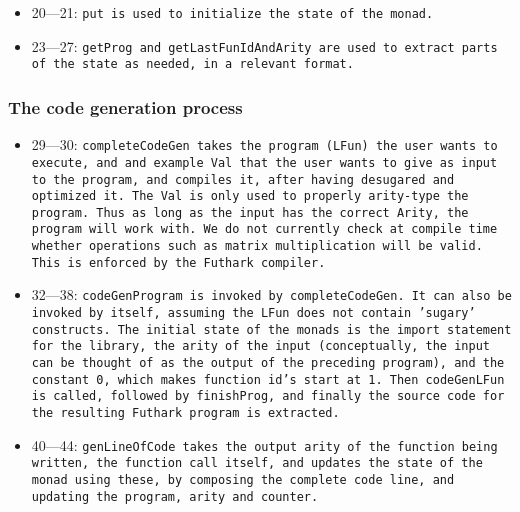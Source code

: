 
\begin{itemize}
	\item 20---21: \tt{put} is used to initialize the state of the monad.
	\item 23---27: \tt{getProg} and \tt{getLastFunIdAndArity} are used to
	extract parts of the state as needed, in a relevant format.
\end{itemize}

\subsubsection{The code generation process}


\begin{itemize}
	\item 29---30: \tt{completeCodeGen} takes the program (\tt{LFun}) the
	user wants to execute, and and example \tt{Val} that the user wants to
	give as input to the program, and compiles it, after having desugared
	and optimized it.  The \tt{Val} is only used to properly arity-type the
	program.  Thus as long as the input has the correct Arity, the program
	will work with.  We do not currently check at compile time whether
	operations such as matrix multiplication will be valid.  This is enforced
	by the Futhark compiler.
\end{itemize}


\begin{itemize}
	\item 32---38: \tt{codeGenProgram} is invoked by \tt{completeCodeGen}.
	It can also be invoked by itself, assuming the \tt{LFun} does not contain
	'sugary' constructs.  The initial state of the monads is the import
	statement for the library, the arity of the input (conceptually, the
	input can be thought of as the output of the preceding program), and the
	constant \tt{0}, which makes function id's start at \tt{1}.  Then
	\tt{codeGenLFun} is called, followed by \tt{finishProg}, and finally the
	source code for the resulting Futhark program is extracted.
\end{itemize}



\begin{itemize}
	\item 40---44: \tt{genLineOfCode} takes the output arity of the function
	being written, the function call itself, and updates the state of the
	monad using these, by composing the complete code line, and updating the
	program, arity and counter.
\end{itemize}

